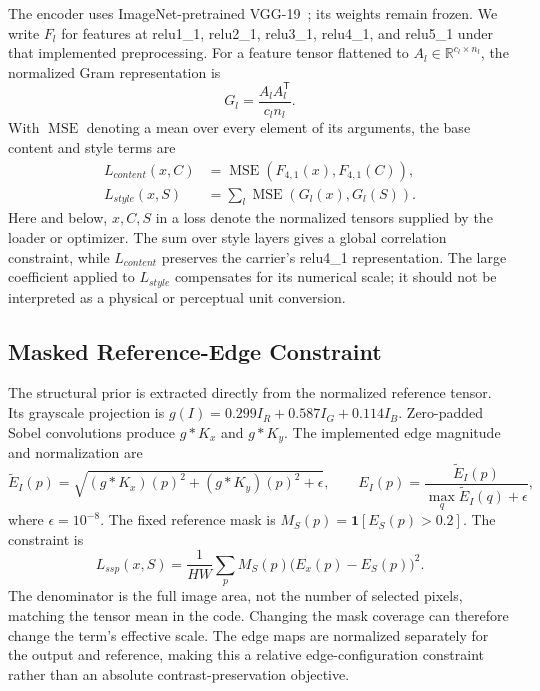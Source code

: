 \documentclass[manuscript,acmlarge,screen,review]{acmart}
\begin{document}
The encoder uses ImageNet-pretrained VGG-19~\cite{simonyan2014}; its weights remain frozen. We write $F_l$ for features at relu1\_1, relu2\_1, relu3\_1, relu4\_1, and relu5\_1 under that implemented preprocessing. For a feature tensor flattened to $A_l\in\mathbb{R}^{c_l\times n_l}$, the normalized Gram representation is
\begin{equation}
G_l=\frac{A_l A_l^{\mathsf T}}{c_l n_l}.
\end{equation}
With $\operatorname{MSE}$ denoting a mean over every element of its arguments, the base content and style terms are
\begin{align}
L_{content}(x,C)&=\operatorname{MSE}(F_{4,1}(x),F_{4,1}(C)),\\
L_{style}(x,S)&=\sum_{l}\operatorname{MSE}(G_l(x),G_l(S)).
\end{align}
Here and below, $x,C,S$ in a loss denote the normalized tensors supplied by the loader or optimizer. The sum over style layers gives a global correlation constraint, while $L_{content}$ preserves the carrier's relu4\_1 representation. The large coefficient applied to $L_{style}$ compensates for its numerical scale; it should not be interpreted as a physical or perceptual unit conversion.

\subsection{Masked Reference-Edge Constraint}
The structural prior is extracted directly from the normalized reference tensor. Its grayscale projection is $g(I)=0.299I_R+0.587I_G+0.114I_B$. Zero-padded Sobel convolutions produce $g* K_x$ and $g*K_y$. The implemented edge magnitude and normalization are
\begin{equation}
\widetilde E_I(p)=\sqrt{(g*K_x)(p)^2+(g*K_y)(p)^2+\epsilon},\qquad
E_I(p)=\frac{\widetilde E_I(p)}{\max_q\widetilde E_I(q)+\epsilon},
\end{equation}
where $\epsilon=10^{-8}$. The fixed reference mask is $M_S(p)=\mathbf{1}[E_S(p)>0.2]$. The constraint is
\begin{equation}
L_{ssp}(x,S)=\frac{1}{HW}\sum_{p}M_S(p)\big(E_x(p)-E_S(p)\big)^2.
\label{eq:ssp}
\end{equation}
The denominator is the full image area, not the number of selected pixels, matching the tensor mean in the code. Changing the mask coverage can therefore change the term's effective scale. The edge maps are normalized separately for the output and reference, making this a relative edge-configuration constraint rather than an absolute contrast-preservation objective.
\end{document}
